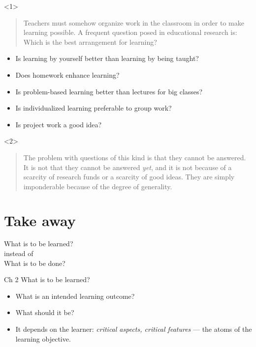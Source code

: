 \begin{frame}
  \begin{onlyenv}<1>
    \begin{remark}
      \blockcquote[p.~21]{NecessaryConditionsOfLearning}{%
        Teachers must somehow organize work in the classroom in order to make 
        learning possible.
        A frequent question posed in educational research is:
        Which is the best arrangement for learning?%
      }
    \end{remark}
  \end{onlyenv}
  \begin{example}
    \begin{itemize}
      \item Is learning by yourself better than learning by being taught?
      \item Does homework enhance learning?
      \item Is problem-based learning better than lectures for big classes?
      \item Is individualized learning preferable to group work?
      \item Is project work a good idea?
    \end{itemize}
  \end{example}
  \begin{onlyenv}<2>
    \begin{remark}
      \blockcquote[p.~21]{NecessaryConditionsOfLearning}{%
        The problem with questions of this kind is that they cannot be 
        answered.
        It is not that they cannot be answered \emph{yet}, and it is not 
        because of a scarcity of research funds or a scarcity of good ideas.
        They are simply imponderable because of the degree of generality.%
      }
    \end{remark}
  \end{onlyenv}
\end{frame}

\section{Take away}

\begin{frame}
  \begin{center}
    What is to be learned?\\[1em]
    instead of\\[1em]
    What is to be done?
  \end{center}
\end{frame}

\begin{frame}
  \begin{block}{Ch 2 What is to be learned?}
    \begin{itemize}
      \item What is an intended learning outcome?
      \item What should it be?
      \item It depends on the learner: \emph{critical aspects, critical 
        features} --- the atoms of the learning objective.
    \end{itemize}
  \end{block}
\end{frame}
